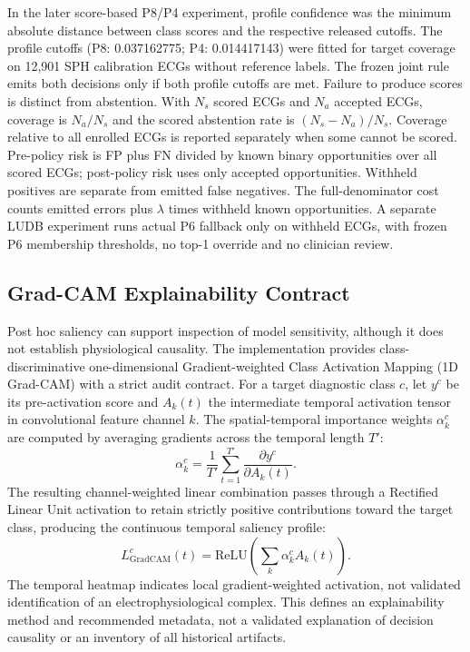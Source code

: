 \documentclass[life,article,submit,moreauthors]{Definitions/mdpi}
\begin{document}
In the later score-based P8/P4 experiment, profile confidence was the minimum absolute distance between class scores and the respective released cutoffs. The profile cutoffs (P8: 0.037162775; P4: 0.014417143) were fitted for target coverage on 12,901 SPH calibration ECGs without reference labels. The frozen joint rule emits both decisions only if both profile cutoffs are met. Failure to produce scores is distinct from abstention. With $N_s$ scored ECGs and $N_a$ accepted ECGs, coverage is $N_a/N_s$ and the scored abstention rate is $(N_s-N_a)/N_s$. Coverage relative to all enrolled ECGs is reported separately when some cannot be scored. Pre-policy risk is FP plus FN divided by known binary opportunities over all scored ECGs; post-policy risk uses only accepted opportunities. Withheld positives are separate from emitted false negatives. The full-denominator cost counts emitted errors plus $\lambda$ times withheld known opportunities. A separate LUDB experiment runs actual P6 fallback only on withheld ECGs, with frozen P6 membership thresholds, no top-1 override and no clinician review.

\subsection{Grad-CAM Explainability Contract}

Post hoc saliency can support inspection of model sensitivity, although it does not establish physiological causality. The implementation provides class-discriminative one-dimensional Gradient-weighted Class Activation Mapping (1D Grad-CAM) \citep{Selvaraju2017Grad} with a strict audit contract. For a target diagnostic class $c$, let $y^c$ be its pre-activation score and $A_k(t)$ the intermediate temporal activation tensor in convolutional feature channel $k$. The spatial-temporal importance weights $\alpha_k^c$ are computed by averaging gradients across the temporal length $T'$:
\begin{equation}
\alpha_k^c=\frac{1}{T'}\sum_{t=1}^{T'}\frac{\partial y^c}{\partial A_k(t)}.
\end{equation}
The resulting channel-weighted linear combination passes through a Rectified Linear Unit activation to retain strictly positive contributions toward the target class, producing the continuous temporal saliency profile:
\begin{equation}
L_{\mathrm{GradCAM}}^c(t)=\mathrm{ReLU}\left(\sum_k \alpha_k^c A_k(t)\right).
\end{equation}
The temporal heatmap indicates local gradient-weighted activation, not validated identification of an electrophysiological complex. This defines an explainability method and recommended metadata, not a validated explanation of decision causality or an inventory of all historical artifacts.
\end{document}
